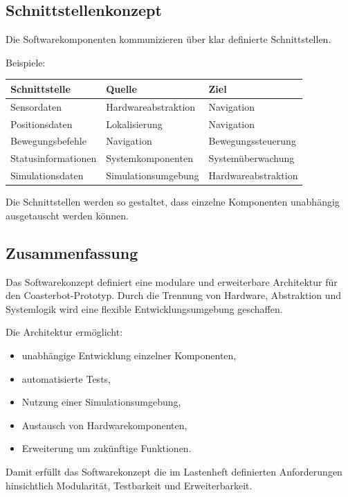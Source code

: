 \subsection{Schnittstellenkonzept}\label{schnittstellenkonzept}

Die Softwarekomponenten kommunizieren über klar definierte
Schnittstellen.

Beispiele:

\begin{longtable}[]{@{}lll@{}}
\toprule\noalign{}
Schnittstelle & Quelle & Ziel \\
\midrule\noalign{}
\endhead
\bottomrule\noalign{}
\endlastfoot
Sensordaten & Hardwareabstraktion & Navigation \\
Positionsdaten & Lokalisierung & Navigation \\
Bewegungsbefehle & Navigation & Bewegungssteuerung \\
Statusinformationen & Systemkomponenten & Systemüberwachung \\
Simulationsdaten & Simulationsumgebung & Hardwareabstraktion \\
\end{longtable}

Die Schnittstellen werden so gestaltet, dass einzelne Komponenten
unabhängig ausgetauscht werden können.

\subsection{Zusammenfassung}\label{zusammenfassung-2}

Das Softwarekonzept definiert eine modulare und erweiterbare Architektur
für den Coasterbot-Prototyp. Durch die Trennung von Hardware,
Abstraktion und Systemlogik wird eine flexible Entwicklungsumgebung
geschaffen.

Die Architektur ermöglicht:

\begin{itemize}
\tightlist
\item
  unabhängige Entwicklung einzelner Komponenten,
\item
  automatisierte Tests,
\item
  Nutzung einer Simulationsumgebung,
\item
  Austausch von Hardwarekomponenten,
\item
  Erweiterung um zukünftige Funktionen.
\end{itemize}

Damit erfüllt das Softwarekonzept die im Lastenheft definierten
Anforderungen hinsichtlich Modularität, Testbarkeit und Erweiterbarkeit.

